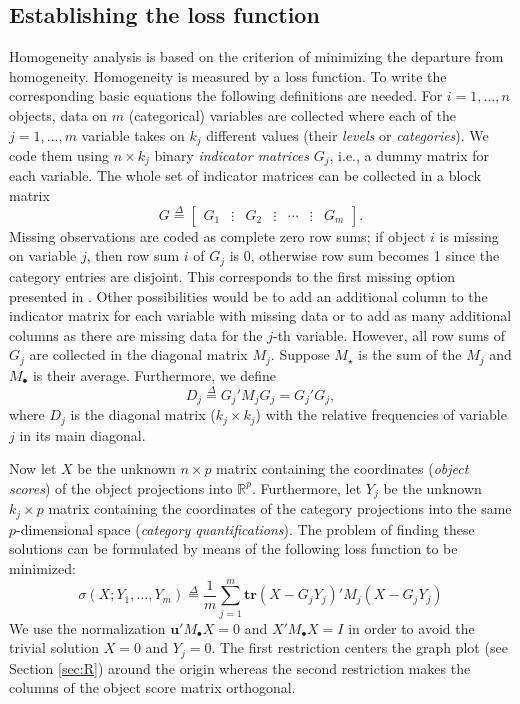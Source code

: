 \documentclass[article]{Z}
\newcommand{\defi}{\mathop{=}\limits^{\Delta}}
\begin{document}
\subsection{Establishing the loss function}
Homogeneity analysis is based on the criterion of minimizing the departure from homogeneity. Homogeneity is measured by a loss function. To write the corresponding basic equations the following definitions are needed. For $i=1,\ldots,n$ objects, data on $m$ (categorical) variables are collected where each of the $j=1,\ldots,m$ variable takes on $k_j$ different values (their \emph{levels} or \emph{categories}). We code them using $n\times k_j$ binary \emph{indicator matrices} $G_j$, i.e., a dummy matrix for each variable. The whole set of indicator matrices can be collected in a block matrix
\begin{equation}
G\defi\begin{bmatrix}G_1&\vdots&G_2&\vdots&\cdots&\vdots&G_m\end{bmatrix}.
\end{equation}
Missing observations are coded as complete zero row sums; if object $i$ is missing on variable $j$, then row
sum $i$ of $G_j$ is 0, otherwise row sum becomes 1 since the category entries are disjoint. This corresponds to the first missing option presented in \citet[p.74]{Gifi:90}. Other possibilities would be to add an additional column to the indicator matrix for each variable with missing data or to add as many additional columns as there are missing data for the $j$-th variable. However, all row sums of $G_j$ are collected in the diagonal matrix $M_j$. Suppose $M_\star$ is the sum of the $M_j$ and $M_\bullet$ is their average. Furthermore, we define
\begin{equation}
D_j^{}\defi G_j'M_j^{}G_j^{}=G_j'G_j^{},
\end{equation}
where $D_j$ is the diagonal matrix ($k_j\times k_j$) with the relative frequencies of variable $j$ in its main diagonal. 

Now let $X$ be the unknown $n\times p$ matrix containing the coordinates (\emph{object scores}) of the object projections into $\mathbb{R}^p$. Furthermore, let $Y_j$ be the unknown $k_j \times p$ matrix containing the coordinates of the category projections into the same $p$-dimensional space (\emph{category quantifications}). 
The problem of finding these solutions can be formulated by means of the following loss function to be minimized:
\begin{equation}
\label{eq:loss}
\sigma(X;Y_1,\ldots,Y_m)\defi\frac{1}{m}\sum_{j=1}^m\mathbf{tr}(X-G_jY_j)'M_j(X-G_jY_j)
\end{equation}
We use the normalization $\mathbf{u}'M_\bullet X=0$ and $X'M_\bullet X=I$ in order to avoid the trivial solution $X=0$ and $Y_j=0$. The first restriction centers the graph plot (see Section \ref{sec:R}) around the origin whereas the second restriction makes the columns of the object score matrix orthogonal.
\end{document}
